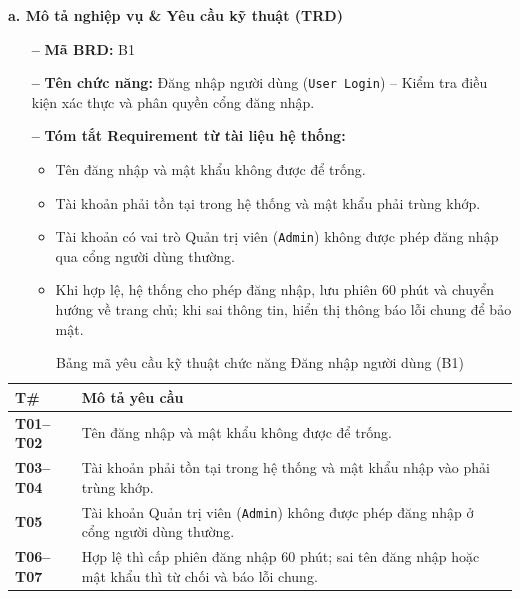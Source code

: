 \documentclass[11pt,a4paper]{article}
\begin{document}
\noindent\textbf{a. Mô tả nghiệp vụ \& Yêu cầu kỹ thuật (TRD)}
\begin{itemize}[leftmargin=1.2cm, noitemsep]
    \item[\textbf{--}] \textbf{Mã BRD:} B1
    \item[\textbf{--}] \textbf{Tên chức năng:} Đăng nhập người dùng (\texttt{User Login}) -- Kiểm tra điều kiện xác thực và phân quyền cổng đăng nhập.
    \item[\textbf{--}] \textbf{Tóm tắt Requirement từ tài liệu hệ thống:}
    \begin{itemize}[leftmargin=0.8cm, label=$\bullet$, noitemsep]
        \item Tên đăng nhập và mật khẩu không được để trống.
        \item Tài khoản phải tồn tại trong hệ thống và mật khẩu phải trùng khớp.
        \item Tài khoản có vai trò Quản trị viên (\texttt{Admin}) không được phép đăng nhập qua cổng người dùng thường.
        \item Khi hợp lệ, hệ thống cho phép đăng nhập, lưu phiên 60 phút và chuyển hướng về trang chủ; khi sai thông tin, hiển thị thông báo lỗi chung để bảo mật.
    \end{itemize}
\end{itemize}

\begin{table}[H]
\centering
\small
\begin{tabularx}{\textwidth}{|C{1.8cm}|X|}
\hline
{}
\textbf{T\#} & \textbf{Mô tả yêu cầu} \tabularnewline
\hline
\textbf{T01--T02} & Tên đăng nhập và mật khẩu không được để trống. \\ \hline
\textbf{T03--T04} & Tài khoản phải tồn tại trong hệ thống và mật khẩu nhập vào phải trùng khớp. \\ \hline
\textbf{T05} & Tài khoản Quản trị viên (\texttt{Admin}) không được phép đăng nhập ở cổng người dùng thường. \\ \hline
\textbf{T06--T07} & Hợp lệ thì cấp phiên đăng nhập 60 phút; sai tên đăng nhập hoặc mật khẩu thì từ chối và báo lỗi chung. \\ \hline
\end{tabularx}
\caption{Bảng mã yêu cầu kỹ thuật chức năng Đăng nhập người dùng (B1)}
\end{table}
\end{document}
